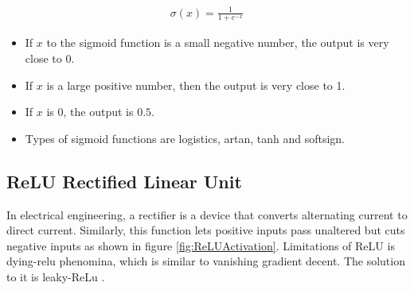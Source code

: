 \begin{align}
    \sigma(x) = \frac{1}{1+ e^{-x}} \label{eq:sigma}
\end{align}

\begin{itemize}
    \item If $x$ to the sigmoid function is a small negative number, the output is very close to 0.
    \item If $x$ is a large positive number, then the output is very close to 1.
    \item If $x$ is 0, the output is $0.5$.
    \item Types of sigmoid functions are logistics, artan, tanh and softsign.
\end{itemize}

\subsection{ReLU Rectified Linear Unit}
In electrical engineering, a rectifier is a device that converts alternating current to direct current. Similarly, this function lets positive inputs pass unaltered but cuts negative inputs as shown in figure  \ref{fig:ReLUActivation}. Limitations of ReLU is dying-relu phenomina, which is similar to vanishing gradient decent. The solution to it is leaky-ReLu  \parencite[section 2.2.2]{Lederer.25012021}. 

